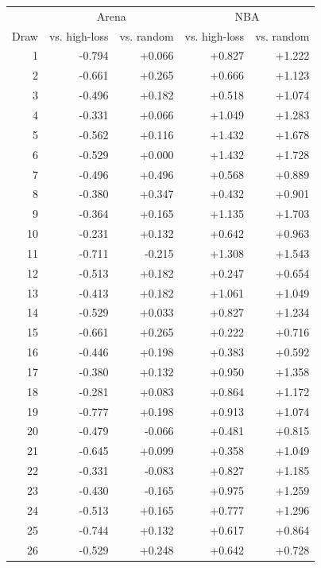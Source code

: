 \documentclass{article}
\begin{document}
\begin{table}[h]
 \centering
 \small
 \begin{tabular}{rrrrr}
 \toprule
  & \multicolumn{2}{c}{Arena} & \multicolumn{2}{c}{NBA} \\
 Draw & vs. high-loss & vs. random & vs. high-loss & vs. random \\
 \midrule
 1 & -0.794 & +0.066 & +0.827 & +1.222 \\
 2 & -0.661 & +0.265 & +0.666 & +1.123 \\
 3 & -0.496 & +0.182 & +0.518 & +1.074 \\
 4 & -0.331 & +0.066 & +1.049 & +1.283 \\
 5 & -0.562 & +0.116 & +1.432 & +1.678 \\
 6 & -0.529 & +0.000 & +1.432 & +1.728 \\
 7 & -0.496 & +0.496 & +0.568 & +0.889 \\
 8 & -0.380 & +0.347 & +0.432 & +0.901 \\
 9 & -0.364 & +0.165 & +1.135 & +1.703 \\
 10 & -0.231 & +0.132 & +0.642 & +0.963 \\
 11 & -0.711 & -0.215 & +1.308 & +1.543 \\
 12 & -0.513 & +0.182 & +0.247 & +0.654 \\
 13 & -0.413 & +0.182 & +1.061 & +1.049 \\
 14 & -0.529 & +0.033 & +0.827 & +1.234 \\
 15 & -0.661 & +0.265 & +0.222 & +0.716 \\
 16 & -0.446 & +0.198 & +0.383 & +0.592 \\
 17 & -0.380 & +0.132 & +0.950 & +1.358 \\
 18 & -0.281 & +0.083 & +0.864 & +1.172 \\
 19 & -0.777 & +0.198 & +0.913 & +1.074 \\
 20 & -0.479 & -0.066 & +0.481 & +0.815 \\
 21 & -0.645 & +0.099 & +0.358 & +1.049 \\
 22 & -0.331 & -0.083 & +0.827 & +1.185 \\
 23 & -0.430 & -0.165 & +0.975 & +1.259 \\
 24 & -0.513 & +0.165 & +0.777 & +1.296 \\
 25 & -0.744 & +0.132 & +0.617 & +0.864 \\
 26 & -0.529 & +0.248 & +0.642 & +0.728 \\

\end{tabular}
\end{table}
\end{document}

